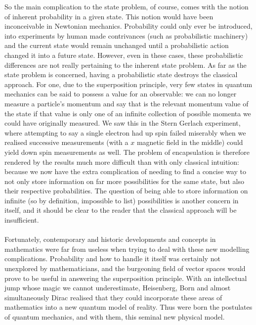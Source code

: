 So the main complication to the state problem, of course, comes with the notion of inherent probability in a given state. This notion would have been inconceivable in Newtonian mechanics. Probability could only ever be introduced, into experiments by human made contrivances (such as probabilistic machinery) and the current state would remain unchanged until a probabilistic action changed it into a future state. However, even in these cases, these probabilistic differences are not really pertaining to the inherent state problem. As far as the state problem is concerned, having a probabilistic state destroys the classical approach. For one, due to the superposition principle, very few states in quantum mechanics can be said to possess a value for an observable: we can no longer measure a particle's momentum and say that is the relevant momentum value of the state if that value is only one of an infinite collection of possible momenta we could have originally measured. We saw this in the Stern Gerlach experiment, where attempting to say a single electron had up spin failed miserably when we realised successive measurements (with a $x$ magnetic field in the middle) could yield down spin measurements as well. The problem of encapsulation is therefore rendered by the results much more difficult than with only classical intuition: because we now have the extra complication of needing to find a concise way to not only store information on far more possibilities for the same state, but also their respective probabilities. The question of being able to store information on infinite (so by definition, impossible to list) possibilities is another concern in itself, and it should be clear to the reader that the classical approach will be insufficient.
\\\\
Fortunately, contemporary and historic developments and concepts in mathematics were far from useless when trying to deal with these new modelling complications. Probability and how to handle it itself was certainly not unexplored by mathematicians, and the burgeoning field of vector spaces would prove to be useful in answering the superposition principle. With an intellectual jump whose magic we cannot underestimate, Heisenberg, Born and almost simultaneously Dirac realised that they could incorporate these areas of mathematics into a new quantum model of reality. Thus were born the postulates of quantum mechanics, and with them, this seminal new physical model.
